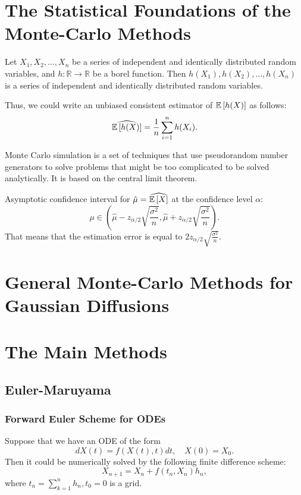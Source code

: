     \section{The Statistical Foundations of the Monte-Carlo Methods}
        \begin{lemma}
            Let $X_1, X_2, \dots, X_n$ be a series of independent and identically distributed random variables, and $h: \mathbb{R} \to \mathbb{R}$ be a borel function. Then $h(X_1), h(X_2), \dots, h(X_n)$ is a series of independent and identically distributed random variables.
        \end{lemma}
        Thus, we could write an unbiased consistent estimator of $\mathbb{E} \left[h(X)\right]$ as follows:
        \begin{equation}
            \widehat{\mathbb{E} \left[h(X)\right]} = \frac{1}{n} \sum_{i=1}^n h(X_i).
        \end{equation}
        \begin{definition}
            Monte Carlo simulation is a set of techniques that use pseudorandom number generators to solve problems that might be too complicated to be solved analytically. It is based on the central limit theorem.
        \end{definition}
        Asymptotic confidence interval for $\hat{\mu} = \widehat{\mathbb{E}\left[X\right]}$ at the confidence level $\alpha$:
        \begin{equation}
            \mu \in \left(\hat{\mu} - z_{\alpha/2} \sqrt{\frac{\sigma^2}{n}}, \hat{\mu} + z_{\alpha/2} \sqrt{\frac{\sigma^2}{n}}\right).
        \end{equation}
        That means that the estimation error is equal to $2z_{\alpha/2} \sqrt{\frac{\sigma^2}{n}}$.


    \section{General Monte-Carlo Methods for Gaussian Diffusions}

    \section{The Main Methods}
        \subsection{Euler-Maruyama}
            \subsubsection{Forward Euler Scheme for ODEs}
                Suppose that we have an ODE of the form
                \begin{equation}
                    dX(t) = f(X(t), t)dt, \quad X(0) = X_0. \label{eq:ode1}
                \end{equation}
                Then it could be numerically solved by the following finite difference scheme:
                \begin{equation}
                    X_{n+1} = X_n + f(t_n, X_n)h_n, \label{Euler:ODE}
                \end{equation}
                where $t_n = \sum_{k=1}^n h_n, t_0 = 0$ is a grid. 

